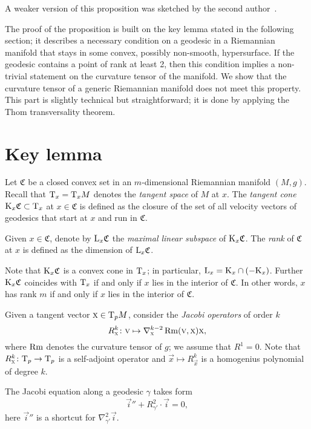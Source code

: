 \documentclass[a4paper,10pt]{article}
\begin{document}
A  weaker version of this proposition was sketched by the second author~\cite{petrunin-2009}.  

The proof of the proposition is built on the key lemma stated in the following section;   
it describes a necessary condition on a geodesic in a Riemannian manifold that stays
in some convex, possibly non-smooth, hypersurface.
If the geodesic contains a point of rank at least 2, then this condition implies a non-trivial
statement on the curvature tensor of the manifold.
We show that the curvature tensor of a generic Riemannian manifold does not meet this property.
This part is slightly technical but straightforward; it is done by applying the Thom transversality theorem.


\section{Key lemma}\label{sec:key}

Let $\mathfrak{C}$ be a closed convex set in an $m$-dimensional Riemannian manifold $(M,g)$.
Recall that $\mathrm{T}_x=\mathrm{T}_xM$ denotes the \emph{tangent space} of $M$ at $x$.
The \emph{tangent cone} $\mathrm{K}_x\mathfrak{C}\subset \mathrm{T}_x$ at $x\in\mathfrak{C}$ is defined as the closure of the set of all velocity vectors of geodesics that start at $x$ and run in $\mathfrak{C}$.

Given $x\in \mathfrak{C}$, denote by $\mathrm{L}_x\mathfrak{C}$ the \emph{maximal linear subspace} of $\mathrm{K}_x\mathfrak{C}$.
The \emph{rank} of $\mathfrak{C}$ at $x$ is defined as the dimension of $\mathrm{L}_x\mathfrak{C}$.

Note that $\mathrm{K}_x\mathfrak{C}$ is a convex cone in $\mathrm{T}_x$; in particular, $\mathrm{L}_x=\mathrm{K}_x\cap (-\mathrm{K}_x)$.
Further $\mathrm{K}_x\mathfrak{C}$ coincides with 
$\mathrm{T}_x$ if and only if
$x$ lies in the interior of $\mathfrak{C}$.
In other words, $x$ has rank $m$ if and only if $x$ lies in the interior of $\mathfrak{C}$.%


Given a tangent vector $\text{\sc{x}}\in\mathrm{T}_pM$, consider the  \emph{Jacobi operators} of order $k$
\[R^k_{\text{\sc{x}}}\colon\text{\sc{v}}\mapsto \nabla^{k-2}_{\text{\sc{x}}}\operatorname{\rm Rm}(\text{\sc{v}},\text{\sc{x}})\text{\sc{x}},\]
where $\operatorname{\rm Rm}$ denotes the curvature tensor of $g$;
we assume that $R^1=0$.
Note that $R^k_{\text{\sc{x}}}\colon\mathrm{T}_p\to \mathrm{T}_p$ is a self-adjoint operator and $\vec{x}\mapsto R^k_{\vec{x}}$ is a homogenius polynomial of degree $k$.

The Jacobi equation along a geodesic $\gamma$ takes form 
\[\vec{i}''+R^2_{\gamma'}\cdot \vec{i}=0,\]
here $\vec{i}''$ is a shortcut for $\nabla^2_{\gamma'}\vec{i}$.
\end{document}
